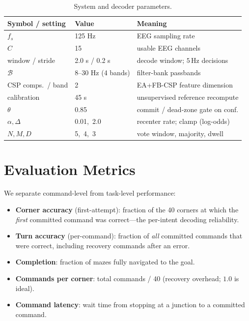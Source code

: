 \documentclass[10pt,journal]{IEEEtran}
\begin{document}
\begin{table}[t]\centering
\caption{System and decoder parameters.}
\label{tab:params}
\begin{tabular}{lll}
\toprule
Symbol / setting & Value & Meaning \\
\midrule
$f_s$              & 125 Hz            & EEG sampling rate \\
$C$                & 15                & usable EEG channels \\
window / stride    & 2.0 s / 0.2 s     & decode window; $5$\,Hz decisions \\
$\mathcal{B}$      & 8--30 Hz (4 bands) & filter-bank passbands \\
CSP comps.\ / band & 2                 & EA+FB-CSP feature dimension \\
calibration        & 45 s              & unsupervised reference recompute \\
$\theta$           & 0.85              & commit / dead-zone gate on conf. \\
$\alpha,\Delta$    & 0.01,\ 2.0        & recenter rate; clamp (log-odds) \\
$N,M,D$            & 5,\ 4,\ 3         & vote window, majority, dwell \\
\bottomrule
\end{tabular}
\end{table}

\section{Evaluation Metrics}
We separate command-level from task-level performance:
\begin{itemize}
\item \textbf{Corner accuracy} (first-attempt): fraction of the 40 corners at which the
\emph{first} committed command was correct---the per-intent decoding reliability.
\item \textbf{Turn accuracy} (per-command): fraction of \emph{all} committed commands that were
correct, including recovery commands after an error.
\item \textbf{Completion}: fraction of mazes fully navigated to the goal.
\item \textbf{Commands per corner}: total commands / 40 (recovery overhead; $1.0$ is ideal).
\item \textbf{Command latency}: wait time from stopping at a junction to a committed command.
\end{itemize}
\end{document}
